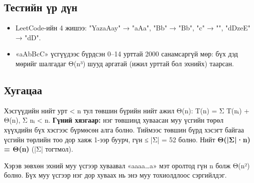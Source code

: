 \documentclass[11pt,a4paper]{article}
\begin{document}
\subsection{Тестийн үр дүн}
\begin{itemize}
\item LeetCode-ийн 4 жишээ: "YazaAay" → "aAa", "Bb" → "Bb", "c" → "", "dDzeE" → "dD".
\item «aAbBcC» үсгүүдээс бүрдсэн 0–14 урттай 2000 санамсаргүй мөр: бүх дэд мөрийг шалгадаг Θ(n³) шууд аргатай (ижил урттай бол эхнийх) таарсан.
\end{itemize}

\subsection{Хугацаа}
Хэсгүүдийн нийт урт < n тул төвшин бүрийн нийт ажил Θ(n): T(n) = Σ T(nᵢ) + Θ(n), Σ nᵢ < n. \textbf{Гүний хязгаар:} нэг төвшинд хуваасан муу үсгийн төрөл хүүхдийн бүх хэсгээс бүрмөсөн алга болно. Тиймээс төвшин бүрд хэсэгт байгаа үсгийн төрлийн тоо дор хаяж 1-ээр буурч, гүн ≤ |Σ| = 52 болно. Нийт \textbf{Θ(|Σ|·n) = Θ(n)} (|Σ| тогтмол).

Хэрэв зөвхөн эхний муу үсгээр хуваавал «aaaa…a» мэт оролтод гүн n болж Θ(n²) болно. Бүх муу үсгээр нэг дор хуваах нь энэ муу тохиолдлоос сэргийлдэг.
\end{document}
